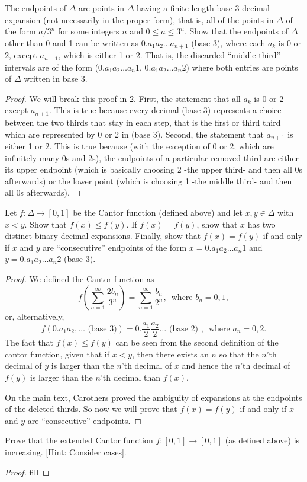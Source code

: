 \begin{exercise}{23}
The endpoints of $\Delta$ are points in $\Delta$ having a finite-length base 3 decimal expansion (not necessarily in the proper form), that is, all of the points in $\Delta$ of the form $a/3^n$ for some integers $n$ and $0\leq a\leq 3^n$. Show that the endpoints of $\Delta$ other than 0 and 1 can be written as $0.a_1a_2\dots a_{n+1}$ (base 3), where each $a_k$ is 0 or 2, except $a_{n+1}$, which is either 1 or 2. That is, the discarded ``middle third'' intervals are of the form ($0.a_1a_2\dots a_{n}1,\, 0.a_1a_2\dots a_n2$) where both entries are points of $\Delta$ written in base 3.
\end{exercise}
\begin{proof}
We will break this proof in 2. First, the statement that all $a_k$ is 0 or 2 except $a_{n+1}$. This is true because every decimal (base 3) represents a choice between the two thirds that stay in each step, that is the first or third third which are represented by 0 or 2 in (base 3). Second, the statement that $a_{n+1}$ is either 1 or 2. This is true because (with the exception of 0 or 2, which are infinitely many 0s and 2s), the endpoints of a particular removed third are either its upper endpoint (which is basically choosing 2 -the upper third- and then all 0s afterwards) or the lower point (which is choosing 1 -the middle third- and then all 0s afterwards).
\end{proof} 

\begin{exercise}{26}
Let $f:\Delta\to[0,1]$ be the Cantor function (defined above) and let $x,y\in\Delta$ with $x<y$. Show that $f(x)\leq f(y)$. If $f(x)=f(y)$, show that $x$ has two distinct binary decimal expansions. Finally, show that $f(x)=f(y)$ if and only if $x$ and $y$ are ``consecutive'' endpoints of the form $x=0.a_1a_2\dots a_n1$ and $y=0.a_1a_2\dots a_n2$ (base 3).
\end{exercise}
\begin{proof}
We defined the Cantor function as 
\[
    f\left(\sum^\infty_{n=1}\frac{2b_n}{3^n}\right)
    =\sum^\infty_{n=1}\frac{b_n}{2^n},\,\text{ where } b_n=0,1,
\]
or, alternatively,
\[
f(0.a_1a_2,\dots\text{ (base 3)})=
0.\frac{a_1}{2}\frac{a_2}{2}\dots\text{ (base 2) },\,\text{ where }a_n=0,2.
\]
The fact that $f(x)\leq f(y)$ can be seen from the second definition of the cantor function, given that if $x<y$, then there exists an $n$ so that the $n$'th decimal of $y$ is larger than the $n$'th decimal of $x$ and hence the $n$'th decimal of $f(y)$ is larger than the $n$'th decimal than $f(x)$.

On the main text, Carothers proved the ambiguity of expansions at the endpoints of the deleted thirds. So now we will prove that $f(x)=f(y)$ if and only if $x$ and $y$ are ``consecutive'' endpoints. 

\end{proof} 

\begin{exercise}{29}
Prove that the extended Cantor function $f:[0,1]\to[0,1]$ (as defined above) is increasing. [Hint: Consider cases].
\end{exercise}
\begin{proof}
fill
\end{proof}
